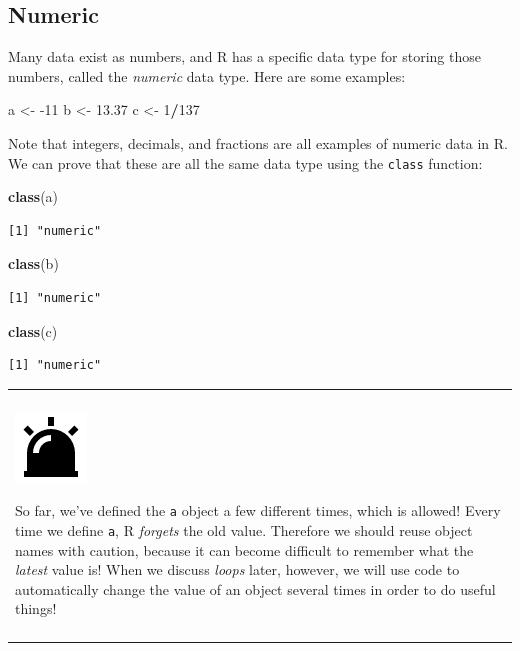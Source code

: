\documentclass[
]{book}
\newenvironment{Shaded}{\begin{snugshade}}{\end{snugshade}}
\newcommand{\DecValTok}[1]{\textcolor[rgb]{0.00,0.00,0.81}{#1}}
\newcommand{\FloatTok}[1]{\textcolor[rgb]{0.00,0.00,0.81}{#1}}
\newcommand{\KeywordTok}[1]{\textcolor[rgb]{0.13,0.29,0.53}{\textbf{#1}}}
\newcommand{\NormalTok}[1]{#1}
\newcommand{\OperatorTok}[1]{\textcolor[rgb]{0.81,0.36,0.00}{\textbf{#1}}}
\newcommand{\StringTok}[1]{\textcolor[rgb]{0.31,0.60,0.02}{#1}}
\newenvironment{caution}
{
  \begin{center}
  \begin{tabular}{|>{\columncolor{caution}}p{0.9\textwidth}|}
  \hline\\
  \includegraphics[scale=0.1]{src/images/alarm-warning-fill.png}
}
{\\\\\hline
  \end{tabular}
  \end{center}
}
\begin{document}
\hypertarget{numeric}{%
\subsection{Numeric}\label{numeric}}

Many data exist as numbers, and R has a specific data type for storing those numbers, called the \emph{numeric} data type.
Here are some examples:

\begin{Shaded}
\begin{Highlighting}[]
\NormalTok{a <-}\StringTok{ }\DecValTok{-11}
\NormalTok{b <-}\StringTok{ }\FloatTok{13.37}
\NormalTok{c <-}\StringTok{ }\DecValTok{1}\OperatorTok{/}\DecValTok{137}
\end{Highlighting}
\end{Shaded}

Note that integers, decimals, and fractions are all examples of numeric data in R.
We can prove that these are all the same data type using the \texttt{class} function:

\begin{Shaded}
\begin{Highlighting}[]
\KeywordTok{class}\NormalTok{(a)}
\end{Highlighting}
\end{Shaded}

\begin{verbatim}
[1] "numeric"
\end{verbatim}

\begin{Shaded}
\begin{Highlighting}[]
\KeywordTok{class}\NormalTok{(b)}
\end{Highlighting}
\end{Shaded}

\begin{verbatim}
[1] "numeric"
\end{verbatim}

\begin{Shaded}
\begin{Highlighting}[]
\KeywordTok{class}\NormalTok{(c)}
\end{Highlighting}
\end{Shaded}

\begin{verbatim}
[1] "numeric"
\end{verbatim}

\begin{caution}
So far, we've defined the \texttt{a} object a few different times, which
is allowed! Every time we define \texttt{a}, R \emph{forgets} the old
value. Therefore we should reuse object names with caution, because it
can become difficult to remember what the \emph{latest} value is! When
we discuss \emph{loops} later, however, we will use code to
automatically change the value of an object several times in order to do
useful things!
\end{caution}
\end{document}
